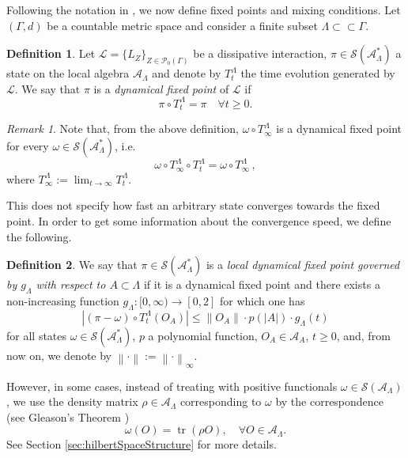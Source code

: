 \documentclass[11pt]{article}
\numberwithin{equation}{section}
\numberwithin{figure}{section}
\numberwithin{table}{section}
\theoremstyle{definition}
\newtheorem{mydef}{Definition}[section]
\theoremstyle{plain}
\theoremstyle{remark}
\newtheorem{obs}[thm]{Remark}
\newcommand{\w}{\omega}
\newcommand{\Li}{\mathcal{L}}
\newcommand{\A}{\mathcal{A}}
\newcommand{\La}{\Lambda}
\newcommand{\G}{\Gamma}
\newcommand{\T}{T^\Lambda}
\newcommand{\g}{g_{\Lambda}}
\newcommand{\norm}[1]{\left\lVert#1\right\rVert}
\newcommand{\normm}[2]{\left\lVert#1\right\rVert_{#2}}
\newcommand{\tr}{\operatorname{tr}}
\newcommand{\abs}[1]{\left \vert#1\right\vert}
\begin{document}
Following the notation in \cite{roon_quasi-locality_2024}, we now define fixed points and mixing conditions. Let $(\Gamma,d)$ be a countable metric space and consider a finite subset $\La\subset\subset \G$.

\medskip
\begin{mydef}\label{def:dynamicalFixedPoint}
    Let $\Li=\{L_Z\}_{Z\in \mathcal{P}_0(\Gamma)}$ be a dissipative interaction, $\pi\in\mathcal{S}(\mathcal{A}_\La^*)$ a state on the local algebra $\mathcal{A}_\Lambda$ and denote by $\T_t$ the time evolution generated by $\Li$. We say that $\pi$ is a \emph{dynamical fixed point} of $\Li$ if
    \begin{equation}
        \pi \circ \T_t=\pi\quad \forall t\geq 0.
    \end{equation}
\end{mydef}

\begin{obs}
    Note that, from the above definition, $\w \circ \T_\infty$ is a dynamical fixed point for every $\omega\in\mathcal{S}(\mathcal{A}_\La^*)$, i.e. \[\w \circ \T_\infty\circ \T_t=\w \circ \T_\infty \, ,\]where $\T_\infty:=\lim_{t\to\infty}\T_t$.
\end{obs}

This does not specify how fast an arbitrary state converges towards the fixed point. In order to get some information about the convergence speed, we define the following. 
\medskip
\begin{mydef}
    We say that $\pi\in\mathcal{S}(\mathcal{A}_\La^*)$ is a \emph{local dynamical fixed point governed by $\g$ with respect to $A\subset\La$} if it is a dynamical fixed point and there exists a non-increasing function $\g:[0,\infty)\to [0,2]$ for which one has 
    \begin{equation}
        \abs{(\pi-\w)\circ \T_t(O_A)}\leq\norm{O_A}\cdot p(\abs{A})\cdot  \g(t)
        \label{eq:localDynamicalFP}
    \end{equation}
    for all states $\w\in\mathcal{S}(\mathcal{A}_\La^*)$, $p$ a polynomial function,  $O_A\in\mathcal{A}_A
    $, $t\geq0$, and, from now on, we denote by $\norm{\cdot}:=\normm{\cdot}{\infty}$.
\end{mydef}

However, in some cases, instead of treating with positive functionals $\w\in\mathcal{S}(\A_\La)$, we use the density matrix $\rho\in\A_\La$ corresponding to $\w$ by the correspondence (see Gleason's Theorem \cite{gleason})\[\w(O)=\tr(\rho O),\quad \forall O\in\A_\La.\]See Section \ref{sec:hilbertSpaceStructure} for more details.
\end{document}
